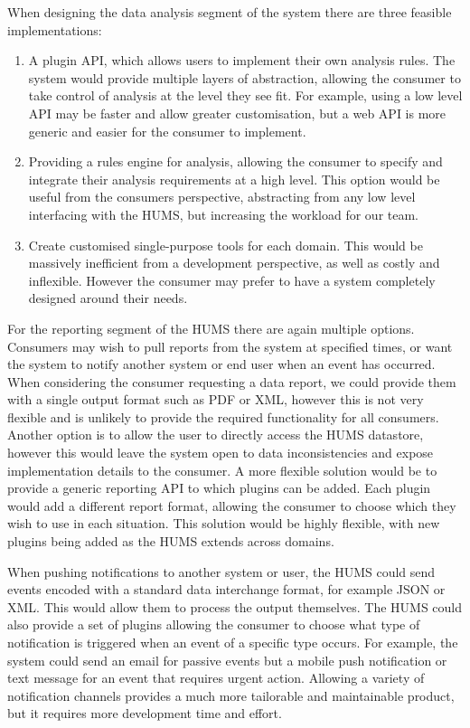 \documentclass[10pt,a4paper]{article}
\begin{document}
When designing the data analysis segment of the system there are three feasible
implementations:
\begin{enumerate}
	\item A plugin API, which allows users to implement their own analysis rules.
	      The system would provide multiple layers of abstraction, allowing the
	      consumer to take control of analysis at the level they see fit. For
	      example, using a low level API may be faster and allow greater
	      customisation, but a web API is more generic and easier for the consumer
	      to implement.
	\item Providing a rules engine for analysis, allowing the consumer to specify
	      and integrate their analysis requirements at a high level. This option
	      would be useful from the consumers perspective, abstracting from any low
	      level interfacing with the HUMS, but increasing the workload for our
	      team.
	\item Create customised single-purpose tools for each domain. This would be
	      massively inefficient from a development perspective, as well as costly
	      and inflexible. However the consumer may prefer to have a system
	      completely designed around their needs. 
\end{enumerate}
For the reporting segment of the HUMS there are again multiple options.
Consumers may wish to pull reports from the system at specified times, or want
the system to notify another system or end user when an event has occurred. When
considering the consumer requesting a data report, we could provide them with a
single output format such as PDF or XML, however this is not very flexible and
is unlikely to provide the required functionality for all consumers. Another
option is to allow the user to directly access the HUMS datastore, however this
would leave the system open to data inconsistencies and expose implementation
details to the consumer. A more flexible solution would be to provide a generic
reporting API to which plugins can be added. Each plugin would add a different
report format, allowing the consumer to choose which they wish to use in each
situation. This solution would be highly flexible, with new plugins being added
as the HUMS extends across domains.

When pushing notifications to another system or user, the HUMS could send events
encoded with a standard data interchange format, for example JSON or XML. This
would allow them to process the output themselves. The HUMS could also provide a
set of plugins allowing the consumer to choose what type of notification is
triggered when an event of a specific type occurs. For example, the system could
send an email for passive events but a mobile push notification or text message
for an event that requires urgent action. Allowing a variety of notification
channels provides a much more tailorable and maintainable product, but it
requires more development time and effort.
\end{document}
